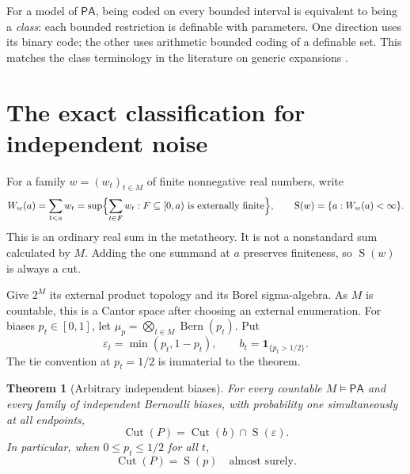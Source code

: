 \documentclass[11pt]{article}
\numberwithin{equation}{section}
\newtheorem{theorem}{Theorem}[section]
\theoremstyle{definition}
\theoremstyle{remark}
\newcommand{\PA}{\mathsf{PA}}
\newcommand{\Cut}{\operatorname{Cut}}
\newcommand{\SumCut}{\operatorname{S}}
\newcommand{\ind}{\mathbf 1}
\newcommand{\Bern}{\operatorname{Bern}}
\begin{document}
For a model of $\PA$, being coded on every bounded interval is equivalent
to being a \emph{class}: each bounded restriction is definable with
parameters. One direction uses its binary code; the other uses arithmetic
bounded coding of a definable set. This matches the class terminology in
the literature on generic expansions \cite{abdul-quader-schmerl}.

\section{The exact classification for independent noise}
\label{rbc:sec:product}

For a family $w=(w_t)_{t\in M}$ of finite nonnegative real numbers, write
\begin{equation}
 W_w(a)=\sum_{t<a}w_t
       =\sup\Bigl\{\sum_{t\in F}w_t:F\subseteq[0,a)
                          \text{ is externally finite}\Bigr\},
 \qquad
 \SumCut(w)=\{a:W_w(a)<\infty\}.
\label{rbc:eq:sumcut}
\end{equation}
This is an ordinary real sum in the metatheory. It is not a nonstandard
sum calculated by $M$. Adding the one summand at $a$ preserves finiteness,
so $\SumCut(w)$ is always a cut.

Give $2^M$ its external product topology and its Borel sigma-algebra. As $M$
is countable, this is a Cantor space after choosing an external enumeration.
For biases $p_t\in[0,1]$, let
$\mu_p=\bigotimes_{t\in M}\Bern(p_t)$. Put
\begin{equation}
 \varepsilon_t=\min(p_t,1-p_t),\qquad
 b_t=\ind_{\{p_t>1/2\}}.
\label{rbc:eq:mode}
\end{equation}
The tie convention at $p_t=1/2$ is immaterial to the theorem.

\begin{theorem}[Arbitrary independent biases]
\label{rbc:thm:product}
For every countable $M\models\PA$ and every family of independent
Bernoulli biases, with probability one simultaneously at all endpoints,
\begin{equation}
 \boxed{\quad\Cut(P)=\Cut(b)\cap\SumCut(\varepsilon).\quad}
\label{rbc:eq:main-product}
\end{equation}
In particular, when $0\le p_t\le1/2$ for all $t$,
\begin{equation}
 \boxed{\quad\Cut(P)=\SumCut(p)\quad\text{almost surely}.\quad}
\label{rbc:eq:zero-modal}
\end{equation}
\end{theorem}
\end{document}
